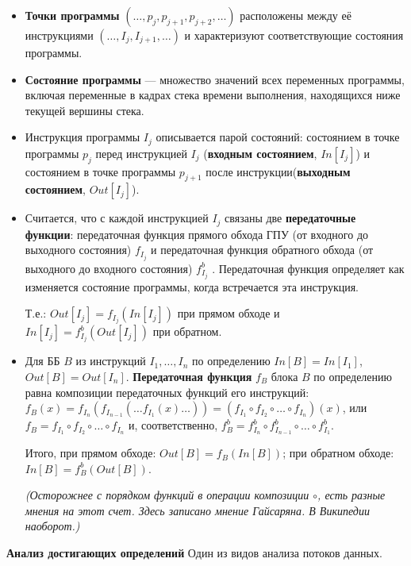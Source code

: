 \begin{itemize}
    \item \textbf{Точки программы} $(\dots, p_j , p_{j+1} , p_{j+2} , \dots)$ расположены между её инструкциями $(\dots, I_j , I_{j+1} , \dots)$ и характеризуют соответствующие состояния программы.
    
    \item \textbf{Состояние программы} --- множество значений всех переменных программы, включая переменные в кадрах стека времени выполнения, находящихся ниже текущей вершины стека.
    
    \item Инструкция программы $I_j$ описывается парой состояний: состоянием в точке программы $p_j$ перед инструкцией $I_j$ (\textbf{входным состоянием}, $In[I_j]$) и состоянием в точке программы $p_{j+1}$ после инструкции(\textbf{выходным состоянием}, $Out[I_j]$).
    
    \item Считается, что с каждой инструкцией $I_j$ связаны две \textbf{передаточные функции}: передаточная функция прямого обхода ГПУ (от входного до выходного состояния) $f_{I_j}$ и передаточная функция обратного обхода (от выходного до входного состояния) $f^b_{I_j}$ . Передаточная функция определяет как изменяется состояние программы, когда встречается эта инструкция.
    
    Т.е.: $Out[I_j] = f_{I_j}(In[I_j])$ при прямом обходе и $In[I_j] = f^b_{I_j}(Out[I_j])$ при обратном.
    \item Для ББ $B$ из инструкций $I_1, \dots, I_n$ по определению $In[B] = In[I_1]$, $Out[B] = Out[I_n]$. 
    \textbf{Передаточная функция} $f_B$ блока $B$ по определению равна композиции передаточных функций его инструкций: $f_B(x) = f_{I_n}(f_{I_{n-1}}(\dots f_{I_1}(x)\dots)) = (f_{I_1} \circ f_{I_2} \circ \dots \circ f_{I_n})(x)$, или $f_B = f_{I_1} \circ f_{I_2} \circ \dots \circ f_{I_n}$ и, соответственно, $f^b_B = f^b_{I_n} \circ f^b_{I_{n-1}} \circ \dots \circ f^b_{I_1}$. 
    
    Итого, при прямом обходе: $Out[B] = f_B(In[B])$; при обратном обходе: $In[B] = f^b_B(Out[B])$.
    
    \textit{(Осторожнее с порядком функций в операции композиции $\circ$, есть разные мнения на этот счет. Здесь записано мнение Гайсаряна. В Википедии наоборот.)}
\end{itemize}

\textbf{Анализ достигающих определений}
    Один из видов анализа потоков данных.

